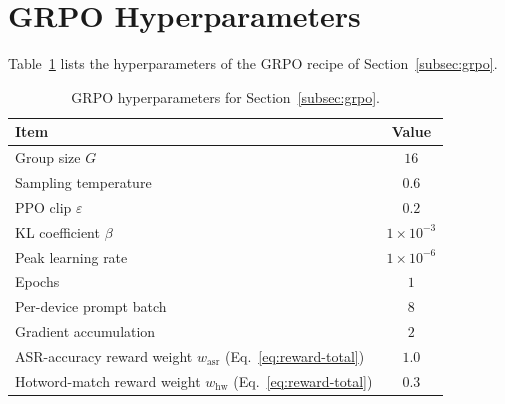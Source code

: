 \section{GRPO Hyperparameters}
\label{app:grpo-hparams}

Table~\ref{tab:grpo_hparams} lists the hyperparameters of the GRPO
recipe of Section~\ref{subsec:grpo}.

\begin{table}[ht]
  \caption{GRPO hyperparameters for Section~\ref{subsec:grpo}.}
  \label{tab:grpo_hparams}
  \centering
  \small
  \begin{tabular}{lc}
    \toprule
    Item & Value \\
    \midrule
    Group size $G$            & $16$ \\
    Sampling temperature      & $0.6$ \\
    PPO clip $\varepsilon$    & $0.2$ \\
    KL coefficient $\beta$    & $1\!\times\!10^{-3}$ \\
    Peak learning rate                                  & $1\!\times\!10^{-6}$ \\
    Epochs                                              & $1$ \\
    Per-device prompt batch                             & $8$ \\
    Gradient accumulation                               & $2$ \\
    ASR-accuracy reward weight $w_\mathrm{asr}$ (Eq.~\ref{eq:reward-total})   & $1.0$ \\
    Hotword-match reward weight $w_\mathrm{hw}$ (Eq.~\ref{eq:reward-total})   & $0.3$ \\
    \bottomrule
  \end{tabular}
\end{table}
